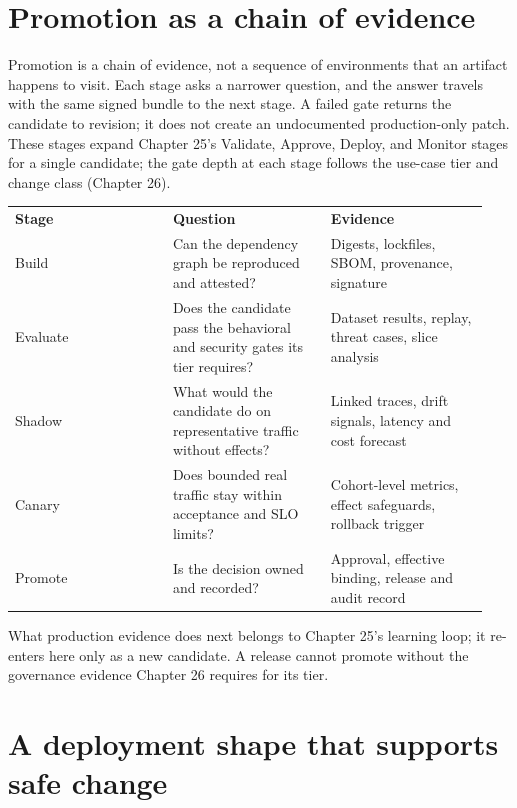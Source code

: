 \section{Promotion as a chain of evidence}

Promotion is a chain of evidence, not a sequence of environments that an artifact happens to visit. Each stage asks a narrower question, and the answer travels with the same signed bundle to the next stage. A failed gate returns the candidate to revision; it does not create an undocumented production-only patch. These stages expand Chapter 25's Validate, Approve, Deploy, and Monitor stages for a single candidate; the gate depth at each stage follows the use-case tier and change class (Chapter 26).\par

\BookTableStart
\small
\begin{tabular}{@{}Y{0.3133\linewidth}Y{0.3133\linewidth}Y{0.3133\linewidth}@{}}
\color{white}\bfseries \textbf{Stage} & \color{white}\bfseries \textbf{Question} & \color{white}\bfseries \textbf{Evidence} \\
Build & Can the dependency graph be reproduced and attested? & Digests, lockfiles, SBOM, provenance, signature \\
Evaluate & Does the candidate pass the behavioral and security gates its tier requires? & Dataset results, replay, threat cases, slice analysis \\
Shadow & What would the candidate do on representative traffic without effects? & Linked traces, drift signals, latency and cost forecast \\
Canary & Does bounded real traffic stay within acceptance and SLO limits? & Cohort-level metrics, effect safeguards, rollback trigger \\
Promote & Is the decision owned and recorded? & Approval, effective binding, release and audit record \\
\end{tabular}
\BookTableEnd

What production evidence does next belongs to Chapter 25's learning loop; it re-enters here only as a new candidate. A release cannot promote without the governance evidence Chapter 26 requires for its tier.\par

\section{A deployment shape that supports safe change}

